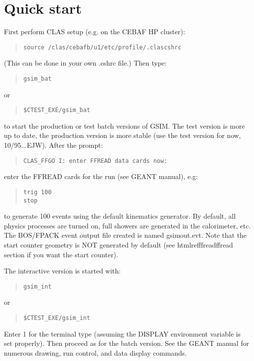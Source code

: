 \documentclass{article}
\begin{document}
\section{Quick start}
\label{quickstart}

First perform CLAS setup (e.g. on the CEBAF HP cluster):
\begin{quote}
{\tt source /clas/cebafb/u1/etc/profile/.clascshrc}
\end{quote}
(This can be done in your own .cshrc file.) Then type:
\begin{quote}
{\tt gsim\_bat}
\end{quote}
or
\begin{quote}
{\tt \$CTEST\_EXE/gsim\_bat}
\end{quote}
to start the production or test batch versions of GSIM.  The test
version is more up to date, the production version is more stable (use
the test version for now, 10/95...EJW).  After the prompt:
\begin{quote}
{\tt CLAS\_FFGO  I: enter FFREAD data cards now:}
\end{quote}
enter the FFREAD cards for the run (see GEANT manual), e.g:
\begin{quote}
{\tt trig 100} \\
{\tt stop}
\end{quote}
to generate 100 events using the default kinematics generator.  By
default, all physics processes are turned on, full showers are
generated in the calorimeter, etc.  The BOS/FPACK event
output file created is named gsimout.evt.  Note that the start counter
geometry is NOT generated by default (see htmlref{ffread}{ffread}
section if you want the start counter).

The interactive version is started with:
\begin{quote}
{\tt gsim\_int}
\end{quote}
or
\begin{quote}
{\tt \$CTEST\_EXE/gsim\_int}
\end{quote}
Enter 1 for the terminal type (assuming the DISPLAY environment
variable is set properly).  Then proceed as for the batch version.
See the GEANT manual for numerous drawing, run control, and data
display commands.
\end{document}
